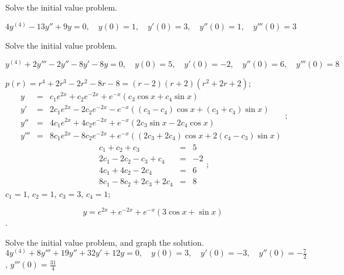 \documentclass{ximera}
\begin{document}
\begin{problem}\label{exer:9.2.25}  Solve the
initial value problem.

$4y^{(4)}-13y''+9y=0, \quad  y(0)=1,\quad y'(0)=3,\quad y''(0)=1,\quad y'''(0)=3$
\end{problem}

\begin{problem}\label{exer:9.2.26}  Solve the
initial value problem.

$y^{(4)}+2y'''-2y''-8y'-8y=0, \quad  y(0)=5,\quad y'(0)=-2,\quad y''(0)=6,\quad y'''(0)=8$

\begin{solution}
$p(r)=r^4+2r^3-2r^2-8r-8=(r-2)(r+2)(r^2+2r+2)$;
$$
\begin{array}{lcl}
y&=&c_1e^{2x}+c_2e^{-2x}+e^{-x}(c_3\cos x+c_4\sin x)\\
y'&=&2c_1e^{2x}-2c_2e^{-2x}-e^{-x}((c_3-c_4)\cos x+(c_3+c_4)\sin x)\\
y''&=&4c_1e^{2x}+4c_2e^{-2x}+e^{-x}(2c_3\sin x-2c_4\cos x)\\
y'''&=&8c_1e^{2x}-8c_2e^{-2x}+e^{-x}((2c_3+2c_4)\cos x+2(c_4-c_3)\sin
x)
\end{array};
$$
$$
\begin{array}{rcr}
c_1+c_2+c_3&=&5\\
2c_1-2c_2-c_3+c_4&=&-2\\
4c_1+4c_2-2c_4&=&6\\
8c_1-8c_2+2c_3+2c_4&=&8
\end{array};
$$
$c_1=1$, $c_2=1$, $c_3=3$, $c_4=1$;

$$y=e^{2x}+e^{-2x}+e^{-x}(3\cos x+\sin x)$$.

\end{solution}
\end{problem}

\begin{problem}\label{exer:9.2.27}  Solve the
initial value problem, and graph the solution.
$4y^{(4)}+8y'''+19y''+32y'+12y=0, \quad  y(0)=3,\quad y'(0)=-3,\quad y''(0)=
-\frac{7}{2}$,
 $y'''(0)=\frac{31}{4}$
\end{problem}
\end{document}
